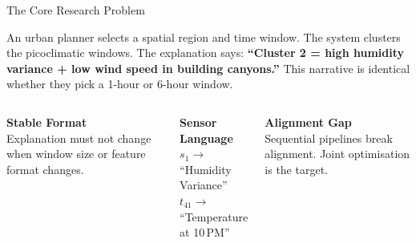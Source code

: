 \documentclass[aspectratio=169]{beamer}
\begin{document}
{
\begin{frame}{The Core Research Problem}
\begin{tcolorbox}[enhanced,boxrule=1.5pt,arc=3pt,
    colback=cdark!80,colframe=cteal,top=5pt,bottom=5pt,left=6pt,right=6pt]
\small\color{caccent}
An urban planner selects a spatial region and time window.
The system clusters the picoclimatic windows.
The explanation says:\space
\textcolor{cteal}{\bfseries``Cluster 2 = high humidity variance + low wind speed in building canyons.''}
\space This narrative is identical whether they pick a 1-hour or 6-hour window.
\end{tcolorbox}
\vspace{0.35cm}
\begin{columns}[T]
  \begin{tcolorbox}[enhanced,boxrule=1.2pt,arc=2pt,colback=cdark!80,colframe=cteal,top=4pt,bottom=4pt,left=4pt,right=4pt]
    {\color{cteal}\bfseries\small Stable Format}\\[2pt]
    {\color{caccent}\footnotesize Explanation must not change when window size or feature format changes.}
  \end{tcolorbox}
  \begin{tcolorbox}[enhanced,boxrule=1.2pt,arc=2pt,colback=cdark!80,colframe=cmid,top=4pt,bottom=4pt,left=4pt,right=4pt]
    {\color{cmid}\bfseries\small Sensor Language}\\[2pt]
    {\color{caccent}\footnotesize $s_1 \to$ ``Humidity Variance''\\$t_{41} \to$ ``Temperature at 10\,PM''}
  \end{tcolorbox}
  \begin{tcolorbox}[enhanced,boxrule=1.2pt,arc=2pt,colback=cdark!80,colframe=cwarn,top=4pt,bottom=4pt,left=4pt,right=4pt]
    {\color{cwarn}\bfseries\small Alignment Gap}\\[2pt]
    {\color{caccent}\footnotesize Sequential pipelines break alignment. Joint optimisation is the target.}
  \end{tcolorbox}
\end{columns}
\end{frame}}
\end{document}
